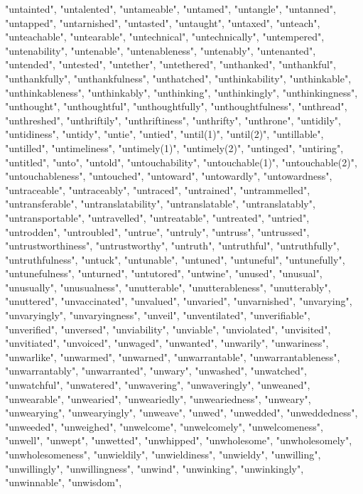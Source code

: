 "untainted",
"untalented",
"untameable",
"untamed",
"untangle",
"untanned",
"untapped",
"untarnished",
"untasted",
"untaught",
"untaxed",
"unteach",
"unteachable",
"untearable",
"untechnical",
"untechnically",
"untempered",
"untenability",
"untenable",
"untenableness",
"untenably",
"untenanted",
"untended",
"untested",
"untether",
"untethered",
"unthanked",
"unthankful",
"unthankfully",
"unthankfulness",
"unthatched",
"unthinkability",
"unthinkable",
"unthinkableness",
"unthinkably",
"unthinking",
"unthinkingly",
"unthinkingness",
"unthought",
"unthoughtful",
"unthoughtfully",
"unthoughtfulness",
"unthread",
"unthreshed",
"unthriftily",
"unthriftiness",
"unthrifty",
"unthrone",
"untidily",
"untidiness",
"untidy",
"untie",
"untied",
"until(1)",
"until(2)",
"untillable",
"untilled",
"untimeliness",
"untimely(1)",
"untimely(2)",
"untinged",
"untiring",
"untitled",
"unto",
"untold",
"untouchability",
"untouchable(1)",
"untouchable(2)",
"untouchableness",
"untouched",
"untoward",
"untowardly",
"untowardness",
"untraceable",
"untraceably",
"untraced",
"untrained",
"untrammelled",
"untransferable",
"untranslatability",
"untranslatable",
"untranslatably",
"untransportable",
"untravelled",
"untreatable",
"untreated",
"untried",
"untrodden",
"untroubled",
"untrue",
"untruly",
"untruss",
"untrussed",
"untrustworthiness",
"untrustworthy",
"untruth",
"untruthful",
"untruthfully",
"untruthfulness",
"untuck",
"untunable",
"untuned",
"untuneful",
"untunefully",
"untunefulness",
"unturned",
"untutored",
"untwine",
"unused",
"unusual",
"unusually",
"unusualness",
"unutterable",
"unutterableness",
"unutterably",
"unuttered",
"unvaccinated",
"unvalued",
"unvaried",
"unvarnished",
"unvarying",
"unvaryingly",
"unvaryingness",
"unveil",
"unventilated",
"unverifiable",
"unverified",
"unversed",
"unviability",
"unviable",
"unviolated",
"unvisited",
"unvitiated",
"unvoiced",
"unwaged",
"unwanted",
"unwarily",
"unwariness",
"unwarlike",
"unwarmed",
"unwarned",
"unwarrantable",
"unwarrantableness",
"unwarrantably",
"unwarranted",
"unwary",
"unwashed",
"unwatched",
"unwatchful",
"unwatered",
"unwavering",
"unwaveringly",
"unweaned",
"unwearable",
"unwearied",
"unweariedly",
"unweariedness",
"unweary",
"unwearying",
"unwearyingly",
"unweave",
"unwed",
"unwedded",
"unweddedness",
"unweeded",
"unweighed",
"unwelcome",
"unwelcomely",
"unwelcomeness",
"unwell",
"unwept",
"unwetted",
"unwhipped",
"unwholesome",
"unwholesomely",
"unwholesomeness",
"unwieldily",
"unwieldiness",
"unwieldy",
"unwilling",
"unwillingly",
"unwillingness",
"unwind",
"unwinking",
"unwinkingly",
"unwinnable",
"unwisdom",
